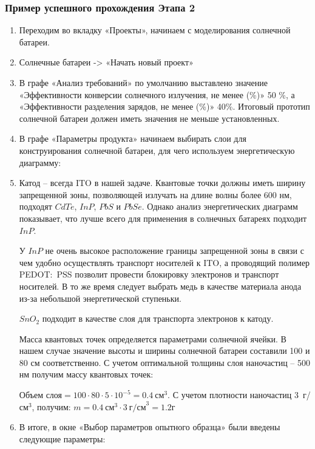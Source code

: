 \subsubsection*{Пример успешного прохождения Этапа 2}

\begin{enumerate}
    \item Переходим во вкладку «Проекты», начинаем с моделирования солнечной батареи.
    \item Солнечные батареи -> «Начать новый проект»
    \item В графе «Анализ требований» по умолчанию выставлено значение «Эффективности конверсии солнечного излучения, не менее (\%)» 50 \%, а «Эффективности разделения зарядов, не менее (\%)» 40\%. Итоговый прототип солнечной батареи должен иметь значения не меньше установленных.
    \item В графе «Параметры продукта» начинаем выбирать слои для конструирования солнечной батареи, для чего используем энергетическую диаграмму:
    

    \item Катод – всегда ITO в нашей задаче. Квантовые точки должны иметь ширину запрещенной зоны, позволяющей излучать на длине волны более 600 нм, подходят $CdTe$, $InP$, $PbS$ и $PbSe$. Однако анализ энергетических диаграмм показывает, что лучше всего для применения в солнечных батареях подходит $InP$.
    
    У $InP$ не очень высокое расположение границы запрещенной зоны в связи с чем удобно осуществлять транспорт носителей к ITO, а проводящий полимер PEDOT:~PSS позволит провести блокировку электронов и транспорт носителей. В то же время следует выбрать медь в качестве материала анода из-за небольшой энергетической ступеньки.
    
    $SnO_2$ подходит в качестве слоя для транспорта электронов к катоду.
    
    Масса квантовых точек определяется параметрами солнечной ячейки. В нашем случае значение высоты и ширины солнечной батареи составили 100 и 80 см соответственно. С учетом оптимальной толщины слоя наночастиц – 500 нм получим массу квантовых точек:

    $\text{Объем слоя} = 100\cdot 80\cdot 5 \cdot 10^{-5} = 0.4 \: \text{см}^3$. С учетом плотности наночастиц 3~г/см$^3$, получим: $m = 0.4 \: \text{см}^3 \cdot 3 \: \text{г/см}^3 = 1.2 г$

    \item В итоге, в окне «Выбор параметров опытного образца» были введены следующие параметры:
    

\end{enumerate}
